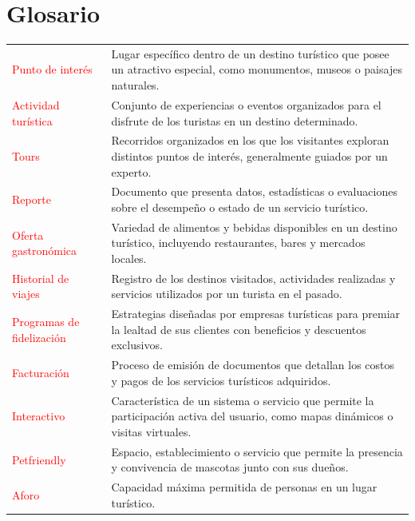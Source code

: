 \chapter{Glosario}


\begin{center}
\begin{tabular}{p{4cm} p{11cm}}
    \textcolor{red}{Punto de interés} & Lugar específico dentro de un destino turístico que posee un atractivo especial, como monumentos, museos o paisajes naturales. \\
    \textcolor{red}{Actividad turística} & Conjunto de experiencias o eventos organizados para el disfrute de los turistas en un destino determinado. \\
    \textcolor{red}{Tours} & Recorridos organizados en los que los visitantes exploran distintos puntos de interés, generalmente guiados por un experto. \\
    \textcolor{red}{Reporte} & Documento que presenta datos, estadísticas o evaluaciones sobre el desempeño o estado de un servicio turístico. \\
    \textcolor{red}{Oferta gastronómica} & Variedad de alimentos y bebidas disponibles en un destino turístico, incluyendo restaurantes, bares y mercados locales. \\
    \textcolor{red}{Historial de viajes} & Registro de los destinos visitados, actividades realizadas y servicios utilizados por un turista en el pasado. \\
    \textcolor{red}{Programas de fidelización} & Estrategias diseñadas por empresas turísticas para premiar la lealtad de sus clientes con beneficios y descuentos exclusivos. \\
    \textcolor{red}{Facturación} & Proceso de emisión de documentos que detallan los costos y pagos de los servicios turísticos adquiridos. \\
    \textcolor{red}{Interactivo} & Característica de un sistema o servicio que permite la participación activa del usuario, como mapas dinámicos o visitas virtuales. \\
    \textcolor{red}{Petfriendly} & Espacio, establecimiento o servicio que permite la presencia y convivencia de mascotas junto con sus dueños. \\
    \textcolor{red}{Aforo} & Capacidad máxima permitida de personas en un lugar turístico. \\
    
\end{tabular}
\end{center}

